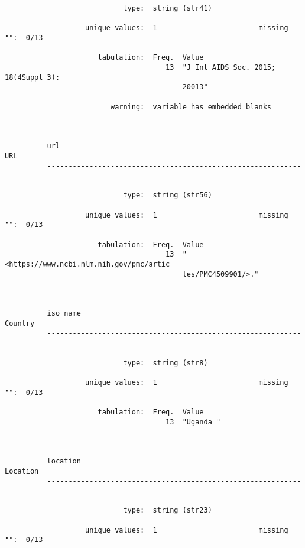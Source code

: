 \documentclass{article}
\begin{document}
\begin{verbatim}
                            type:  string (str41)
          
                   unique values:  1                        missing "":  0/13
          
                      tabulation:  Freq.  Value
                                      13  "J Int AIDS Soc. 2015; 18(4Suppl 3):
                                          20013"
          
                         warning:  variable has embedded blanks
          
          ------------------------------------------------------------------------------------------
          url                                                                                    URL
          ------------------------------------------------------------------------------------------
          
                            type:  string (str56)
          
                   unique values:  1                        missing "":  0/13
          
                      tabulation:  Freq.  Value
                                      13  "<https://www.ncbi.nlm.nih.gov/pmc/artic
                                          les/PMC4509901/>."
          
          ------------------------------------------------------------------------------------------
          iso_name                                                                           Country
          ------------------------------------------------------------------------------------------
          
                            type:  string (str8)
          
                   unique values:  1                        missing "":  0/13
          
                      tabulation:  Freq.  Value
                                      13  "Uganda "
          
          ------------------------------------------------------------------------------------------
          location                                                                          Location
          ------------------------------------------------------------------------------------------
          
                            type:  string (str23)
          
                   unique values:  1                        missing "":  0/13
          

\end{verbatim}
\end{document}
